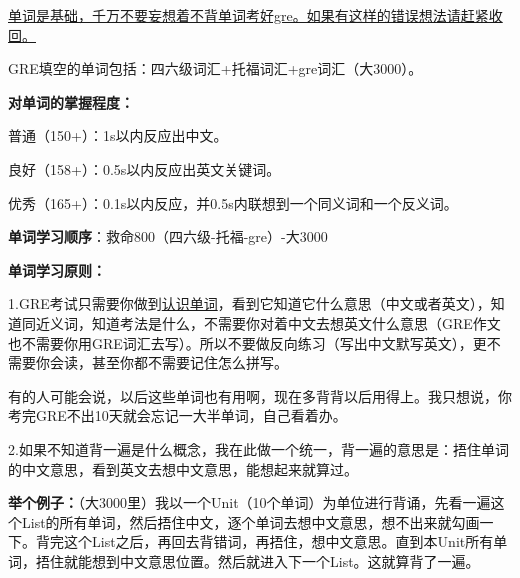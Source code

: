 \documentclass[cn,plain]{./src/qyxfbook}
\newcommand{\red}[1]{\textcolor[rgb]{1,0,0}{#1}}
\begin{document}
				\underline{单词是基础，千万不要妄想着不背单词考好gre。如果有这样的错误想法请赶紧收回。}

				
				GRE填空的单词包括：四六级词汇+托福词汇+gre词汇（大3000）。\par
				\textbf{对单词的掌握程度：}\par
				普通（150+）：1s以内反应出中文。\par
				良好（158+）：0.5s以内反应出英文关键词。\par
				优秀（165+）：0.1s以内反应，并0.5s内联想到一个同义词和一个反义词。

				
				\textbf{单词学习顺序}：救命800（四六级-托福-gre）-大3000\par
				\textbf{单词学习原则：}\par
				1.GRE考试只需要你做到\red{\underline{认识单词}}，看到它知道它什么意思（中文或者英文），知道同近义词，知道考法是什么，不需要你对着中文去想英文什么意思（GRE作文也不需要你用GRE词汇去写）。所以不要做反向练习（写出中文默写英文），更不需要你会读，甚至你都不需要记住怎么拼写。\par
				有的人可能会说，以后这些单词也有用啊，现在多背背以后用得上。我只想说，你考完GRE不出10天就会忘记一大半单词，自己看着办。\par
				2.如果不知道背一遍是什么概念，我在此做一个统一，背一遍的意思是：捂住单词的中文意思，看到英文去想中文意思，能想起来就算过。\par
				\textbf{举个例子：}（大3000里）我以一个Unit（10个单词）为单位进行背诵，先看一遍这个List的所有单词，然后捂住中文，逐个单词去想中文意思，想不出来就勾画一下。背完这个List之后，再回去背错词，再捂住，想中文意思。直到本Unit所有单词，捂住就能想到中文意思位置。然后就进入下一个List。这就算背了一遍。
\end{document}
